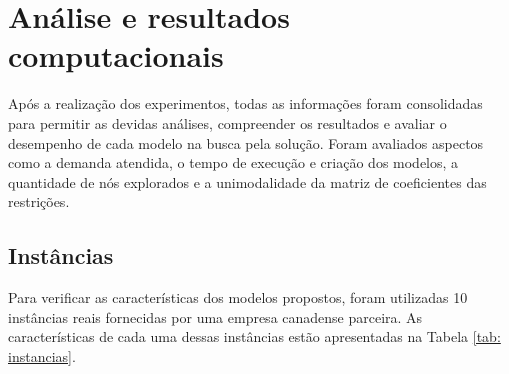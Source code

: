 \chapter{Análise e resultados computacionais}

Após a realização dos experimentos, todas as informações foram consolidadas para permitir as devidas análises, compreender os resultados e avaliar o desempenho de cada modelo na busca pela solução. Foram avaliados aspectos como a demanda atendida, o tempo de execução e criação dos modelos, a quantidade de nós explorados e a unimodalidade da matriz de coeficientes das restrições.


\section{Instâncias}

Para verificar as características dos modelos propostos, foram utilizadas 10 instâncias reais fornecidas por uma empresa canadense parceira. As características de cada uma dessas instâncias estão apresentadas na Tabela \ref{tab: instancias}.

